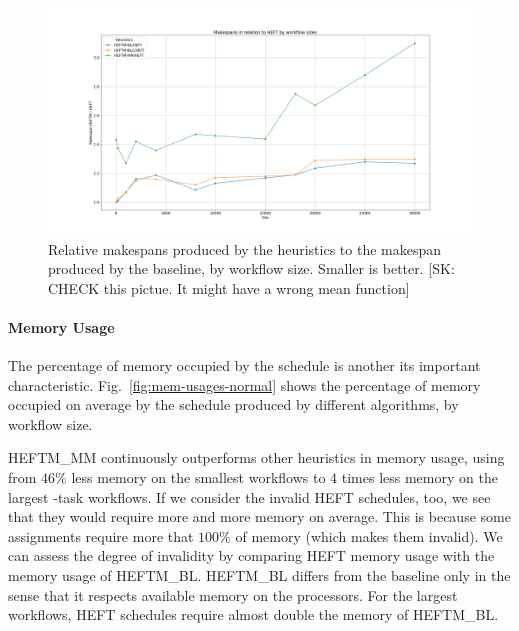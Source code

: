 \documentclass[conference]{IEEEtran}
\newcommand{\algo}[1]{\textsc{#1}}
\newcommand{\heft}{\algo{HEFT}\xspace}
\newcommand{\heftmm}{\algo{HEFTM\_MM}\xspace}
\newcommand{\heftbl}{\algo{HEFTM\_BL}\xspace}
\newcommand{\skug}[1]{{\color{blue}[SK: #1]}}
\begin{document}
    \begin{figure}[tb]
        \centering
        \includegraphics[width=1.1\columnwidth] {images/makespan_relations_by_wf_size}
        \caption{Relative makespans produced by the heuristics to the makespan produced by the baseline, by workflow
        size. Smaller is better. \skug{CHECK this pictue. It might have a wrong mean function}}
        \label{fig:ms-relations-by-workflow}
        \vspace{-0.3cm}
    \end{figure}

    \paragraph{Memory Usage}

    The percentage of memory occupied by the schedule is another its important characteristic.
    Fig.~\ref{fig:mem-usages-normal} shows the percentage of memory occupied on average by the schedule produced by different
    algorithms, by workflow size.

    \heftmm continuously outperforms other heuristics in memory usage, using from $46\%$ less memory on the smallest
    workflows to $4$ times less memory on the largest -task workflows.
    If we consider the invalid \heft schedules, too, we see that they would require more and more memory on average.
    This is because some assignments require more that $100\%$ of memory (which makes them invalid).
    We can assess the degree of invalidity by comparing \heft memory usage with the memory usage of \heftbl.
    \heftbl differs from the baseline only in the sense that it respects available memory on the processors.
    For the largest workflows, \heft schedules require almost double the memory of \heftbl.
\end{document}
